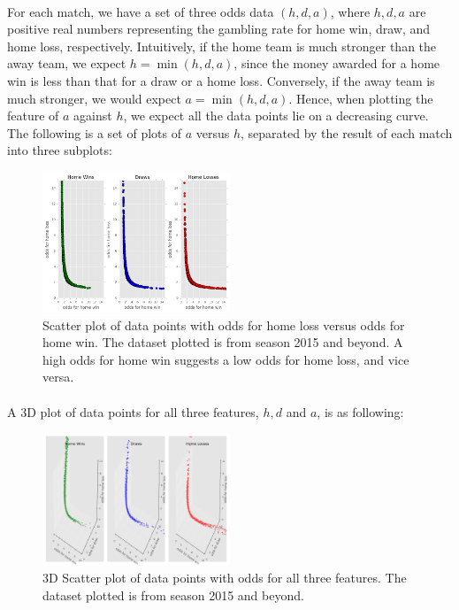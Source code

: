 \documentclass[12pt]{article}
\begin{document}
\paragraph{} For each match, we have a set of three odds data $(h, d, a)$, where $h, d, a$ are positive real numbers representing the gambling rate for home win, draw, and home loss, respectively. Intuitively, if the home team is much stronger than the away team, we expect $h = \min(h, d, a)$, since the money awarded for a home win is less than that for a draw or a home loss. Conversely, if the away team is much stronger, we would expect $a = \min(h, d, a)$. Hence, when plotting the feature of $a$ against $h$, we expect all the data points lie on a decreasing curve. The following is a set of plots of $a$ versus $h$, separated by the result of each match into three subplots:
\begin{figure}[!ht]
	\centering
	\includegraphics[width=0.5\textwidth]{2D_15.png}
	\caption{Scatter plot of data points with odds for home loss versus odds for home win. The dataset plotted is from season 2015 and beyond. A high odds for home win suggests a low odds for home loss, and vice versa.}
\end{figure}
\paragraph{}
A 3D plot of data points for all three features, $h, d$ and $a$, is as following:
\begin{figure}[!ht]
	\centering
	\includegraphics[width=0.5\textwidth]{3D_15.png}
	\caption{3D Scatter plot of data points with odds for all three features. The dataset plotted is from season 2015 and beyond.}
\end{figure}
\end{document}
